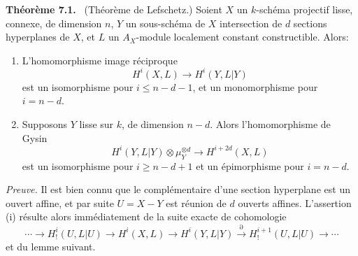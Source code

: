\documentclass[11pt]{article}
\newenvironment{statement}[1]{\par\medskip\noindent\textbf{#1.}\ }{\par\medskip}
\begin{document}
\begin{statement}{Théorème 7.1}
(Théorème de Lefschetz.) Soient $X$ un $k$-schéma projectif lisse, connexe, de dimension $n$, $Y$ un sous-schéma de $X$ intersection de $d$ sections hyperplanes de $X$, et $L$ un $A_X$-module localement constant constructible. Alors:
\begin{enumerate}[label=(\roman*)]
\item L'homomorphisme image réciproque
\[
H^i(X,L)\to H^i(Y,L|Y)
\]
est un isomorphisme pour $i\le n-d-1$, et un monomorphisme pour $i=n-d$.
\item Supposons $Y$ lisse sur $k$, de dimension $n-d$. Alors l'homomorphisme de Gysin
\[
H^i(Y,L|Y)\otimes\mu_Y^{\otimes d}\to H^{i+2d}(X,L)
\]
est un isomorphisme pour $i\ge n-d+1$ et un épimorphisme pour $i=n-d$.
\end{enumerate}
\end{statement}

\emph{Preuve.} Il est bien connu que le complémentaire d'une section hyperplane est un ouvert affine, et par suite $U=X-Y$ est réunion de $d$ ouverts affines. L'assertion (i) résulte alors immédiatement de la suite exacte de cohomologie
\[
\cdots\to H_!^i(U,L|U)\to H^i(X,L)\to H^i(Y,L|Y)
\xrightarrow{\partial} H_!^{i+1}(U,L|U)\to\cdots
\]
et du lemme suivant.
\end{document}
